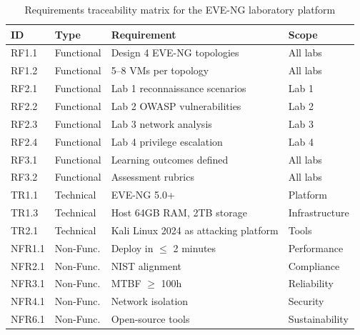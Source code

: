 \begin{table}[H]
  \centering
  \small
  \setlength{\tabcolsep}{4pt}
  \renewcommand{\arraystretch}{1.1}
  \begin{tabularx}{\textwidth}{l l X l}
    \toprule
    \textbf{ID} & \textbf{Type} & \textbf{Requirement} & \textbf{Scope} \\
    \midrule
    RF1.1  & Functional   & Design 4 EVE-NG topologies                    & All labs     \\
    RF1.2  & Functional   & 5–8 VMs per topology                          & All labs     \\
    RF2.1  & Functional   & Lab 1 reconnaissance scenarios                & Lab 1        \\
    RF2.2  & Functional   & Lab 2 OWASP vulnerabilities                    & Lab 2        \\
    RF2.3  & Functional   & Lab 3 network analysis                         & Lab 3        \\
    RF2.4  & Functional   & Lab 4 privilege escalation                     & Lab 4        \\
    RF3.1  & Functional   & Learning outcomes defined                      & All labs     \\
    RF3.2  & Functional   & Assessment rubrics                             & All labs     \\
    TR1.1  & Technical    & EVE-NG 5.0+                                    & Platform     \\
    TR1.3  & Technical    & Host 64GB RAM, 2TB storage                     & Infrastructure \\
    TR2.1  & Technical    & Kali Linux 2024 as attacking platform         & Tools        \\
    NFR1.1 & Non-Func.    & Deploy in $\leq$ 2 minutes                     & Performance  \\
    NFR2.1 & Non-Func.    & NIST alignment                                 & Compliance   \\
    NFR3.1 & Non-Func.    & MTBF $\geq$ 100h                               & Reliability  \\
    NFR4.1 & Non-Func.    & Network isolation                              & Security     \\
    NFR6.1 & Non-Func.    & Open-source tools                              & Sustainability \\
    \bottomrule
  \end{tabularx}
  \caption[Requirements traceability]{Requirements traceability matrix for the EVE-NG laboratory platform}
  \label{tab:requirements_traceability}
\end{table}

